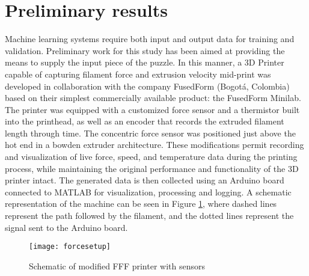 \documentclass[main.tex]{subfiles}
\begin{document}
\section{Preliminary results} \label{sec:prelim}

Machine learning systems require both input and output data for training and validation. Preliminary work for this study has been aimed at providing the means to supply the input piece of the puzzle. In this manner, a 3D Printer capable of capturing filament force and extrusion velocity mid-print was developed in collaboration with the company FusedForm (Bogot\'{a}, Colombia) based on their simplest commercially available product: the FusedForm Minilab. The printer was equipped with a customized force sensor and a thermistor built into the printhead, as well as an encoder that records the extruded filament length through time. The concentric force sensor was positioned just above the hot end in a bowden extruder architecture. These modifications permit recording and visualization of live force, speed, and temperature data during the printing process, while maintaining the original performance and functionality of the 3D printer intact. The generated data is then collected using an Arduino board connected to MATLAB for visualization, processing and logging. A schematic representation of the machine can be seen in Figure \ref{fig:shakira}, where dashed lines represent the path followed by the filament, and the dotted lines represent the signal sent to the Arduino board.

\begin{figure}[!htbp]
	\center
	\texttt{[image: forcesetup]}
	\caption{Schematic of modified FFF printer with sensors} \label{fig:shakira}
\end{figure}
\end{document}
